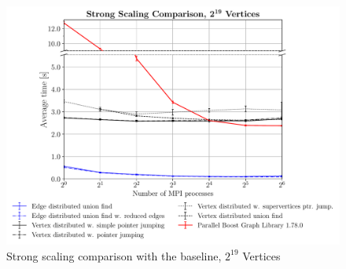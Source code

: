 \documentclass[letterpaper]{article}
\begin{document}


% 

\begin{figure}
  \includegraphics[width=\columnwidth]{../benchmark-results/plots/strongscaling_s19.pdf}
  \caption{Strong scaling comparison with the baseline, $2^{19}$ Vertices}
  \label{fig:strongscaling-19}
\end{figure}
\end{document}
